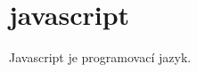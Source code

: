 \documentclass[main.tex]{subfiles}
\begin{document}
\section{javascript}
Javascript je programovací jazyk.
\end{document}
